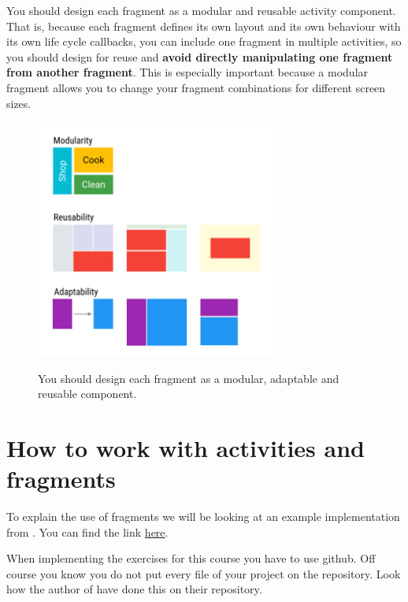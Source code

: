 You should design each fragment as a modular and reusable activity component. That is, because each fragment defines its own layout and its own behaviour with its own life cycle callbacks, you can include one fragment in multiple activities, so you should design for reuse and \textbf{avoid directly manipulating one fragment from another fragment}. This is especially important because a modular fragment allows you to change your fragment combinations for different screen sizes.

\begin{figure}
	\centering
	\includegraphics[width=0.7\textwidth]{images/fragments/framgentswhy.png}
	\label{fig:whyfragments}
	\caption{You should design each fragment as a modular, adaptable and reusable component.}
\end{figure}

\section{How to work with activities and fragments}
To explain the use of fragments we will be looking at an example implementation from  \cite{murphymarkl.2017}. You can find the link \href{https://github.com/commonsguy/cw-omnibus/tree/master/Fragments/Static}{here}.

\begin{framed}
	When implementing the exercises for this course you have to use github. Off course you know you do not put every file of your project on the repository. Look how the author of \cite{murphymarkl.2017} have done this on their repository. 
\end{framed}

